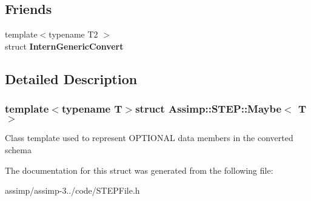 \subsection*{Friends}
\begin{DoxyCompactItemize}
\item 
\hypertarget{struct_assimp_1_1_s_t_e_p_1_1_maybe_a956fabc7f4c78a057496766330e0ef59}{{\footnotesize template$<$typename T2 $>$ }\\struct {\bfseries Intern\+Generic\+Convert}}\label{struct_assimp_1_1_s_t_e_p_1_1_maybe_a956fabc7f4c78a057496766330e0ef59}

\end{DoxyCompactItemize}


\subsection{Detailed Description}
\subsubsection*{template$<$typename T$>$struct Assimp\+::\+S\+T\+E\+P\+::\+Maybe$<$ T $>$}

Class template used to represent O\+P\+T\+I\+O\+N\+A\+L data members in the converted schema 

The documentation for this struct was generated from the following file\+:\begin{DoxyCompactItemize}
\item 
assimp/assimp-\/3../code/S\+T\+E\+P\+File.\+h\end{DoxyCompactItemize}
